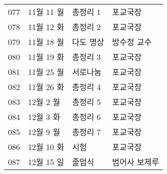 \documentclass[12pt, a4paper, oneside]{book}
\begin{document}
\begin{center}
\begin{longtable}{| l | l | l |  l |}
077	&		11월	11	월	&	총정리 1	&	포교국장	\\
078	&		11월	12	화	&	총정리 2	&	포교국장	\\
079	&		11월	18	월	&	다도 명상	&	방수정 교수	\\
080	&		11월	19	화	&	총정리 3	&	포교국장	\\
081	&		11월	25	월	&	서로나눔	&	포교국장	\\
082	&		11월	26	화	&	총정리 4	&	포교국장	\\
		\hline
		\hline
083	&		12월	2	월	&	총정리 5	&	포교국장	\\
084	&		12월	3	화	&	총정리 6	&	포교국장	\\
085	&		12월	9	월	&	총정리 7	&	포교국장	\\
086	&		12월	10	화	&	시험	&	포교국장	\\
		\hline
		\hline
087	&		12월	15	일	&	졸업식	&	범어사 보제루	\\


\end{longtable}
\end{center}




\end{document}
